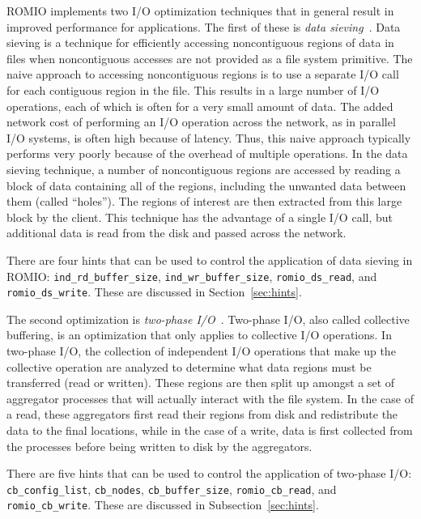 ROMIO implements two I/O optimization techniques that in general
result in improved performance for applications.  The first of these
is \emph{data sieving}~\cite{choudhary:passion}.  Data sieving is a
technique for efficiently accessing noncontiguous regions of data in files
when noncontiguous accesses are not provided as a file system primitive.
The naive approach to accessing noncontiguous regions is to use a separate
I/O call for each contiguous region in the file.  This results in a large
number of I/O operations, each of which is often for a very small amount
of data.  The added network cost of performing an I/O operation across the
network, as in parallel I/O systems, is often high because of latency.
Thus, this naive approach typically performs very poorly because of
the overhead of multiple operations.  
% 
In the data sieving technique, a number of noncontiguous regions are
accessed by reading a block of data containing all of the regions,
including the unwanted data between them (called ``holes'').  The regions
of interest are then extracted from this large block by the client.
This technique has the advantage of a single I/O call, but additional
data is read from the disk and passed across the network.

There are four hints that can be used to control the application of
data sieving in ROMIO: \texttt{ind\_rd\_buffer\_size},
\texttt{ind\_wr\_buffer\_size}, \texttt{romio\_ds\_read},
and \texttt{romio\_ds\_write}.  These are discussed in
Section~\ref{sec:hints}.

The second optimization is \emph{two-phase
I/O}~\cite{bordawekar:primitives}.  Two-phase I/O, also called collective
buffering, is an optimization that only applies to collective I/O
operations.  In two-phase I/O, the collection of independent I/O operations
that make up the collective operation are analyzed to determine what
data regions must be transferred (read or written).  These regions are
then split up amongst a set of aggregator processes that will actually
interact with the file system.  In the case of a read, these aggregators
first read their regions from disk and redistribute the data to the
final locations, while in the case of a write, data is first collected
from the processes before being written to disk by the aggregators.

There are five hints that can be used to control the application
of two-phase I/O: \texttt{cb\_config\_list}, \texttt{cb\_nodes},
\texttt{cb\_buffer\_size}, \texttt{romio\_cb\_read},
and \texttt{romio\_cb\_write}.  These are discussed in
Subsection~\ref{sec:hints}.

